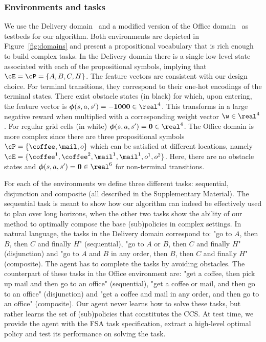 \subsubsection{Environments and tasks} We use the Delivery domain~\cite{Araki2021} and a modified version of the Office domain~\cite{Icarte2018} as testbeds for our algorithm. Both environments are depicted in Figure~\ref{fig:domains} and present a propositional vocabulary that is rich enough to build complex tasks. In the Delivery domain there is a single low-level state associated with each of the propositional symbols, implying that ${\cE=\cP=\{A,B,C, H\}}$. The feature vectors are consistent with our design choice. For terminal transitions, they correspond to their one-hot encodings of the terminal states. There exist obstacle states (in black) for which, upon entering,  the feature vector is $\boldsymbol{\phi}(s,a,s')=\mathbf{-1000}\in\real^4$. This transforms in a large negative reward when multiplied with a corresponding weight vector $\w\in\real^{4}$. For regular grid cells (in white) $\boldsymbol{\phi}(s,a,s')=\mathbf{0}\in\real^{4}$. The Office domain is more complex since there are three propositional symbols $\cP=\{\text{\coffee}, \text{\mail}, o\}$ which can be satisfied at different locations, namely $\cE=\{\text{\coffee}^1, \text{\coffee}^2, \text{\mail}^1, \text{\mail}^1, o^1, o^2\}$. Here, there are no obstacle states and $\boldsymbol{\phi}(s,a,s')=\mathbf{0}\in\real^6$ for non-terminal transitions.

For each of the environments we define three different tasks: sequential, disjunction and composite (all described in the Supplementary Material). The sequential task is meant to show how our algorithm can indeed be effectively used to plan over long horizons, when the other two tasks show the ability of our method to optimally compose the base (sub)policies in complex settings. In natural language, the tasks in the Delivery domain correspond to: "go to $A$, then $B$, then $C$ and finally $H$"  (sequential), "go to $A$ or $B$, then $C$ and finally $H$" (disjunction) and "go to $A$ and $B$ in any order, then $B$, then $C$ and finally $H$" (composite). The agent has to complete the tasks by avoiding obstacles. The counterpart of these tasks in the Office environment are: "get a coffee, then pick up mail and then go to an office" (sequential), "get a coffee or mail, and then go to an office" (disjunction) and "get a coffee and mail in any order, and then go to an office" (composite). 
Our agent never learns how to solve these tasks, but rather learns the set of (sub)policies that constitutes the CCS. At test time, we provide the agent with the FSA task specification, extract a high-level optimal policy and test its performance on solving the task.

